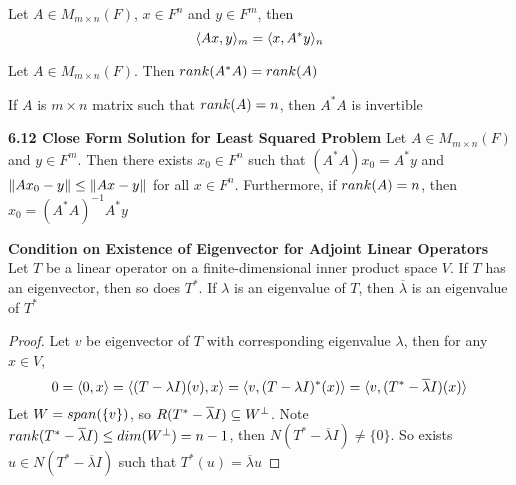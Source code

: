 \documentclass[11pt]{article}
\begin{document}
\begin{lemma*}
    Let $A\in M_{m\times n}(F)$, $x\in F^n$ and $y\in F^m$, then 
    \[
        \langle Ax,y\rangle_m = \langle x,A^*y\rangle_n    
    \]
\end{lemma*}

\begin{lemma*}
    Let $A\in M_{m\times n}(F)$. Then $rank(A^*A)=rank(A)$
\end{lemma*}

\begin{corollary*}
    If $A$ is $m\times n$ matrix such that $rank(A)=n$, then $A^*A$ is invertible
\end{corollary*}


\begin{theorem*}
    \textbf{6.12 Close Form Solution for Least Squared Problem} Let $A\in M_{m\times n}(F)$ and $y\in F^m$. Then there exists $x_0\in F^n$ such that $(A^*A)x_0 = A^*y$ and $\left\lVert Ax_0 - y\right\rVert \leq \left\lVert Ax -y\right\rVert$ for all $x\in F^n$. Furthermore, if $rank(A)=n$, then $x_0 = (A^*A)^{-1}A^*y$ 
\end{theorem*}



\begin{lemma*}
    \textbf{Condition on Existence of Eigenvector for Adjoint Linear Operators} Let $T$ be a linear operator on a finite-dimensional inner product space $V$. If $T$ has an eigenvector, then so does $T^*$. If $\lambda$ is an eigenvalue of $T$, then $\overline{\lambda}$ is an eigenvalue of $T^*$
    \begin{proof}
        Let $v$ be eigenvector of $T$ with corresponding eigenvalue $\lambda$, then for any $x\in V$,
        \[
            0 = \langle0,x\rangle = \langle(T-\lambda I)(v),x\rangle = \langle v,(T - \lambda I)^*(x)\rangle = \langle v,(T^* - \overline{\lambda} I)(x)\rangle
        \]
        Let $W = span(\{v\})$, so $R(T^* - \overline{\lambda}I) \subseteq W^{\perp}$. Note $rank(T^*-\overline{\lambda}I) \leq dim(W^{\perp}) = n-1$, then $N(T^* - \overline{\lambda}I) \neq \{0\}$. So exists $u\in N(T^* - \overline{\lambda}I)$ such that $T^*(u) = \overline{\lambda}u$
    \end{proof}
\end{lemma*}
\end{document}
